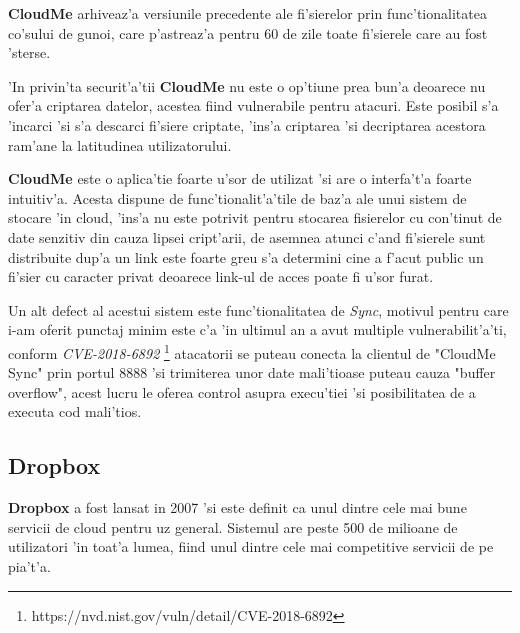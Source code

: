 \documentclass[12pt,a4paper,twoside]{report}
\begin{document}
\textbf{CloudMe} arhiveaz'a  versiunile precedente ale fi'sierelor  prin func'tionalitatea co'sului de gunoi, care p'astreaz'a pentru 60 de zile toate fi'sierele care au fost 'sterse.

'In privin'ta securit'a'tii \textbf{CloudMe} nu este o op'tiune prea bun'a deoarece nu ofer'a criptarea datelor, acestea fiind vulnerabile pentru atacuri. Este posibil s'a 'incarci 'si s'a descarci fi'siere criptate, 'ins'a criptarea 'si decriptarea acestora ram'ane la latitudinea utilizatorului.


\textbf{CloudMe} este o aplica'tie foarte u'sor de utilizat 'si are o interfa't'a foarte intuitiv'a. Acesta dispune de func'tionalit'a'tile de baz'a ale unui sistem de stocare 'in cloud, 'ins'a nu este potrivit pentru stocarea fisierelor cu con'tinut de date senzitiv din cauza lipsei cript'arii, de asemnea atunci c'and fi'sierele sunt distribuite dup'a un link este foarte greu s'a determini cine a f'acut public un fi'sier cu caracter privat deoarece link-ul de acces poate fi u'sor furat.

Un alt defect al acestui sistem este func'tionalitatea de {\it Sync}, motivul pentru care i-am oferit punctaj minim este c'a 'in ultimul an a avut multiple vulnerabilit'a'ti, conform {\it CVE-2018-6892} \footnote{https://nvd.nist.gov/vuln/detail/CVE-2018-6892} atacatorii se puteau conecta la clientul de  "CloudMe Sync" prin portul 8888 'si trimiterea unor date mali'tioase puteau cauza "buffer overflow", acest lucru le oferea control asupra execu'tiei 'si posibilitatea de a executa cod mali'tios.


\subsection{Dropbox} \label{dropbox}


\textbf{Dropbox} a fost lansat in 2007 'si este definit ca unul dintre cele mai bune servicii de cloud pentru uz general\cite{cloudwards_best}. Sistemul are peste 500 de milioane de utilizatori 'in toat'a lumea, fiind unul dintre cele mai competitive servicii de pe pia't'a. 
\end{document}
